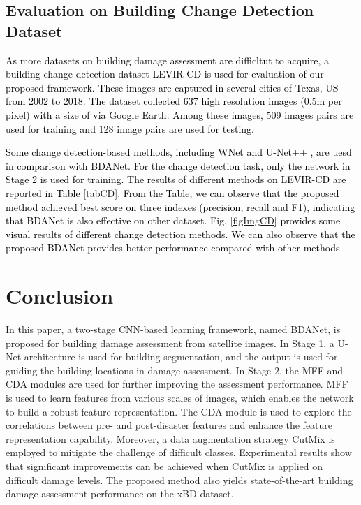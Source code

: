 \documentclass[journal]{IEEEtran}
\begin{document}
\subsection{Evaluation on Building Change Detection Dataset}
\textcolor{black}{As more datasets on building damage assessment are difficltut to acquire, a building change detection dataset LEVIR-CD \cite{chenSpatialTemporalAttentionBasedMethod2020} is used for evaluation of our proposed framework. These images are captured in several cities of Texas, US from 2002 to 2018. The dataset collected 637 high resolution images (0.5m per pixel) with a size of  via Google Earth. Among these images, 509 images pairs are used for training and 128 image pairs are used for testing.}

\textcolor{black}{Some change detection-based methods, including WNet \cite{houWNetCDGANBitemporal2020} and U-Net++ \cite{pengEndtoEndChangeDetection2019}, are uesd in comparison with BDANet. For the change detection task, only the network in Stage 2 is used for training. The results of different methods on LEVIR-CD are reported in Table \ref{tabCD}. From the Table, we can observe that the proposed method achieved best score on three indexes (precision, recall and F1), indicating that BDANet is also effective on other dataset. Fig. \ref{figImgCD} provides some visual results of different change detection methods. We can also observe that the proposed BDANet provides better performance compared with other methods.}


\section{Conclusion}
\label{SecConclusion}
In this paper, a two-stage CNN-based learning framework, named BDANet, is proposed for building damage assessment from satellite images. In Stage 1, a U-Net architecture is used for building segmentation, and the output is used for guiding the building locations in damage assessment. In Stage 2, the MFF and CDA modules are used for further improving the assessment performance. MFF is used to learn features from various scales of images, which enables the network to build a robust feature representation. The CDA module is used to explore the correlations between pre- and post-disaster features and enhance the feature representation capability. Moreover, a data augmentation strategy CutMix is employed to mitigate the challenge of difficult classes. Experimental results show that significant improvements can be achieved when CutMix is applied on difficult damage levels. The proposed method also yields state-of-the-art building damage assessment performance on the xBD dataset.
\end{document}
